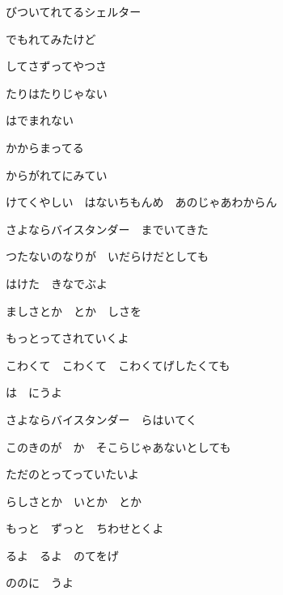 \documentclass[14pt]{extreport}
\begin{document}
{\item
  びついてれてるシェルター
  \jisho{}

  でもれてみたけど
  \jisho{}

  してさずってやつさ
  \jisho{}

  たりはたりじゃない
  \jisho{}

  はでまれない
  \jisho{}

  かからまってる
  \jisho{}

  からがれてにみてい
  \jisho{}

  けてくやしい　はないちもんめ　あのじゃあわからん
  \jisho{}


\item
  さよならバイスタンダー　までいてきた
  \jisho{}

  つたないのなりが　いだらけだとしても

  はけた　きなでぶよ
  \jisho{}

  ましさとか　とか　しさを
  \jisho{}

  もっとってされていくよ
  \jisho{}

  こわくて　こわくて　こわくてげしたくても
  \jisho{}

  は　にうよ
  \jisho{}


\item
  さよならバイスタンダー　らはいてく
  \jisho{}

  このきのが　か　そこらじゃあないとしても
  \jisho{}

  ただのとってっていたいよ
  \jisho{}

  らしさとか　いとか　とか
  \jisho{}

  もっと　ずっと　ちわせとくよ
  \jisho{}

  るよ　るよ　のてをげ
  \jisho{}

  ののに　うよ
  \jisho{}

}
\end{document}
